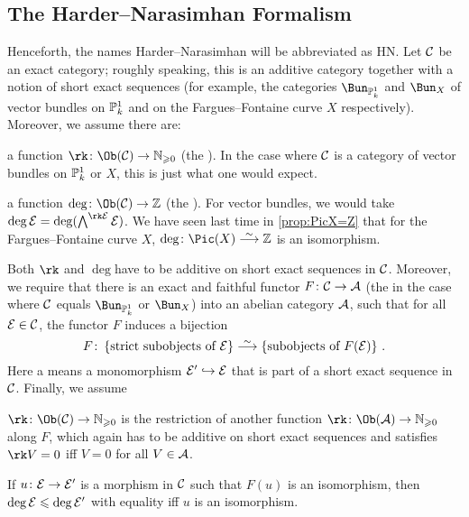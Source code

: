 \documentclass[a4paper, 10pt, oneside, DIV=9, chapterprefix=true, numbers=enddot,bibliography=totoc]{scrbook}
\begin{document}
\subsection{The Harder--Narasimhan Formalism}\label{subsec:HNFormalism}
Henceforth, the names Harder--Narasimhan will be abbreviated as HN. Let $\mathcal{C}$ be an exact category; roughly speaking, this is an additive category together with a notion of short exact sequences (for example, the categories $\Bun_{\IP_k^1}$ and $\Bun_X$ of vector bundles on $\mathbb{P}_k^1$ and on the Fargues--Fontaine curve $X$ respectively). Moreover, we assume there are:
\begin{alphanumerate}
	\item a function $\rk\colon \Ob(\Cc)\morphism \IN_{\geq 0}$ (the ). In the case where $\mathcal{C}$ is a category of vector bundles on $\mathbb{P}_k^1$ or $X$, this is just what one would expect.
	\item a function $\deg \colon \Ob(\Cc)\morphism \IZ$ (the ). For vector bundles, we would take $\deg \Ee=\deg (\bigwedge^{\rk \Ee}\Ee)$. We have seen last time in \cref{prop:PicX=Z} that for the Fargues--Fontaine curve $X$, $\deg \colon \Pic(X)\isomorphism\IZ$ is an isomorphism. 
\end{alphanumerate}
Both $\rk$ and $\deg $have to be additive on short exact sequences in $\mathcal{C}$. Moreover, we require that there is an exact and faithful functor $F\colon \Cc\morphism \Aa$ (the  in the case where $\mathcal{C}$ equals $\Bun_{\IP_k^1}$ or $\Bun_X$) into an abelian category $\mathcal{A}$, such that for all $\mathcal{E}\in \mathcal{C}$, the functor $F$ induces a bijection
\begin{equation*}
	F\colon \left\{\text{strict subobjects of }\Ee\right\}\isomorphism \left\{\text{subobjects of }F(\Ee)\right\}\,.
\end{equation*}
Here a  means a monomorphism $\Ee'\monomorphism \Ee$ that is part of a short exact sequence in $\mathcal{C}$. Finally, we assume
\begin{numerate}
	\item $\rk\colon \Ob(\Cc)\morphism \IN_{\geq 0}$ is the restriction of another function $\rk\colon \Ob(\Aa)\morphism \IN_{\geq 0}$ along $F$, which again has to be additive on short exact sequences and satisfies $\rk V=0$ iff $V=0$ for all $V\in \mathcal{A}$.
	\item If $u\colon \Ee\morphism\Ee'$ is a morphism in $\mathcal{C}$ such that $F(u)$ is an isomorphism, then $\deg \mathcal{E}\leqslant \deg \mathcal{E}'$ with equality iff $u$ is an isomorphism.
\end{numerate}
\end{document}
